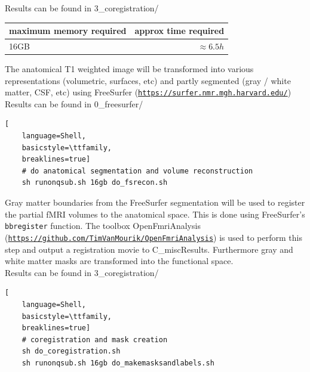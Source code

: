 \documentclass[12pt,a4paper]{scrartcl}
\begin{document}
\noindent Results can be found in 3\_coregistration/\\
\begin{table}[h]
\begin{tabular}{l | r}
\toprule
maximum memory required & approx time required\\\toprule
16GB & $\approx 6.5h$ \\\bottomrule
\end{tabular}
\end{table}
\FloatBarrier
\noindent The anatomical T1 weighted image will be transformed into various representations (volumetric, surfaces, etc) and partly segmented (gray / white matter, CSF, etc) using FreeSurfer (\href{https://surfer.nmr.mgh.harvard.edu/}{\nolinkurl{https://surfer.nmr.mgh.harvard.edu/}})\\

\noindent Results can be found in 0\_freesurfer/\\
\begin{lstlisting}[
    language=Shell,
    basicstyle=\ttfamily,
    breaklines=true]
    # do anatomical segmentation and volume reconstruction
    sh runonqsub.sh 16gb do_fsrecon.sh
\end{lstlisting}
Gray matter boundaries from the FreeSurfer segmentation will be used to register the partial fMRI volumes to the anatomical space. This is done using FreeSurfer's \texttt{bbregister} function. The toolbox OpenFmriAnalysis (\href{https://github.com/TimVanMourik/OpenFmriAnalysis}{\nolinkurl{https://github.com/TimVanMourik/OpenFmriAnalysis}}) is used to perform this step and output a registration movie to C\_miscResults. Furthermore gray and white matter masks are transformed into the functional space.\\

\noindent Results can be found in 3\_coregistration/\\
\begin{lstlisting}[
    language=Shell,
    basicstyle=\ttfamily,
    breaklines=true]
    # coregistration and mask creation
    sh do_coregistration.sh
    sh runonqsub.sh 16gb do_makemasksandlabels.sh
\end{lstlisting}
\end{document}
